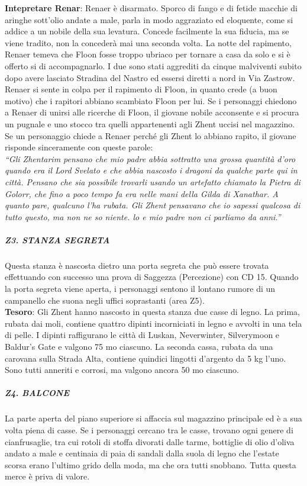 \documentclass{article}
\begin{document}
\textbf{Intepretare Renar}: Renaer è disarmato. Sporco di fango e di fetide macchie di
aringhe sott'olio andate a male, parla in modo aggraziato
ed eloquente, come si addice a un nobile della sua levatura.
Concede facilmente la sua fiducia, ma se viene tradito, non
la concederà mai una seconda volta.
La notte del rapimento, Renaer temeva che Floon fosse
troppo ubriaco per tornare a casa da solo e si è offerto si
di accompagnarlo. I due sono stati aggrediti da cinque
malviventi subito dopo avere lasciato Stradina del Nastro
ed essersi diretti a nord in Via Zastrow.
Renaer si sente in colpa per il rapimento di Floon,
in quanto crede (a buon motivo) che i rapitori abbiano scambiato Floon per lui. Se i personaggi chiedono a
Renaer di unirsi alle ricerche di Floon, il giovane nobile
acconsente e si procura un pugnale e uno stocco tra quelli
appartenenti agli Zhent uccisi nel magazzino.
Se un personaggio chiede a Renaer perché gli Zhent
lo abbiano rapito, il giovane risponde sinceramente con
queste parole: \\

\textit{“Gli Zhentarim pensano che mio padre abbia sottratto
una grossa quantità d'oro quando era il Lord Svelato
e che abbia nascosto i dragoni da qualche parte qui
in città. Pensano che sia possibile trovarli usando un
artefatto chiamato la Pietra di Golorr, che fino a poco
tempo fa era nelle mani della Gilda di Xanathar. A quanto
pare, qualcuno l'ha rubata. Gli Zhent pensavano che io
sapessi qualcosa di tutto questo, ma non ne so niente. lo
e mio padre non ci parliamo da anni.”}

\subparagraph{Z3. STANZA SEGRETA}
Questa stanza è nascosta dietro una porta segreta che
può essere trovata effettuando con successo una prova di
Saggezza (Percezione) con CD 15. Quando la porta segreta
viene aperta, i personaggi sentono il lontano rumore di un
campanello che suona negli uffici soprastanti (area Z5). \\

\textbf{Tesoro}: Gli Zhent hanno nascosto in questa stanza due casse di
legno. La prima, rubata dai moli, contiene quattro dipinti
incorniciati in legno e avvolti in una tela di pelle. I dipinti raffigurano le città di Luskan, Neverwinter, Silverymoon e
Baldur's Gate e valgono 75 mo ciascuno.
La seconda cassa, rubata da una carovana sulla Strada
Alta, contiene quindici lingotti d'argento da 5 kg l'uno. Sono
tutti anneriti e corrosi, ma valgono ancora 50 mo ciascuno.

\subparagraph{Z4. BALCONE}
La parte aperta del piano superiore si affaccia sul
magazzino principale ed è a sua volta piena di casse. Se
i personaggi cercano tra le casse, trovano ogni genere di
cianfrusaglie, tra cui rotoli di stoffa divorati dalle tarme,
bottiglie di olio d'oliva andato a male e centinaia di paia
di sandali dalla suola di legno che l'estate scorsa erano
l'ultimo grido della moda, ma che ora tutti snobbano. Tutta
questa merce è priva di valore.
\end{document}
